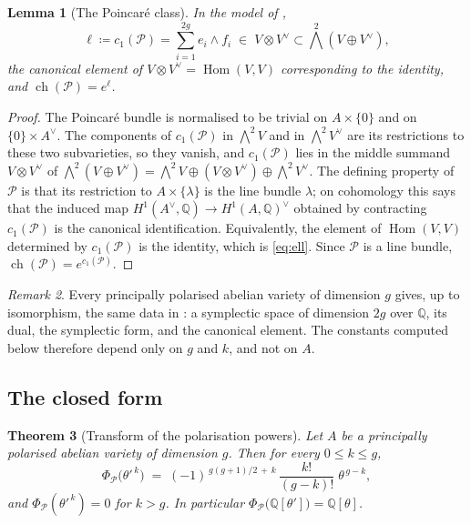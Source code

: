 \documentclass[11pt,reqno]{amsart}
\theoremstyle{plain}
\newtheorem{theorem}{Theorem}[section]
\newtheorem{lemma}[theorem]{Lemma}
\theoremstyle{definition}
\theoremstyle{remark}
\newtheorem{remark}[theorem]{Remark}
\newcommand{\QQ}{\mathbb{Q}}
\newcommand{\Av}{A^{\vee}}
\newcommand{\cP}{\mathcal{P}}
\DeclareMathOperator{\ch}{ch}
\DeclareMathOperator{\Hom}{Hom}
\begin{document}
\begin{lemma}[The Poincar\'e class]\label{lem:poincare}
In the model of ,
\begin{equation}\label{eq:ell}
  \ell\coloneqq c_{1}(\cP)=\sum_{i=1}^{2g}e_{i}\wedge f_{i}
  \;\in\;V\otimes V^{\vee}\subset\textstyle\bigwedge^{2}(V\oplus V^{\vee}),
\end{equation}
the canonical element of $V\otimes V^{\vee}=\Hom(V,V)$ corresponding to the
identity, and $\ch(\cP)=e^{\ell}$.
\end{lemma}

\begin{proof}
The Poincar\'e bundle is normalised to be trivial on $A\times\{0\}$ and on
$\{0\}\times\Av$. The components of $c_{1}(\cP)$ in $\bigwedge^{2}V$ and in
$\bigwedge^{2}V^{\vee}$ are its restrictions to these two subvarieties, so
they vanish, and $c_{1}(\cP)$ lies in the middle summand $V\otimes V^{\vee}$
of
$\bigwedge^{2}(V\oplus V^{\vee})=\bigwedge^{2}V\oplus(V\otimes V^{\vee})\oplus\bigwedge^{2}V^{\vee}$.
The defining property of $\cP$ is that its restriction to $A\times\{\lambda\}$
is the line bundle $\lambda$; on cohomology this says that the induced map
$H^{1}(\Av,\QQ)\to H^{1}(A,\QQ)^{\vee}$ obtained by contracting $c_{1}(\cP)$ is
the canonical identification. Equivalently, the element of $\Hom(V,V)$
determined by $c_{1}(\cP)$ is the identity, which is \eqref{eq:ell}. Since
$\cP$ is a line bundle, $\ch(\cP)=e^{c_{1}(\cP)}$.
\end{proof}

\begin{remark}\label{rem:universal}
Every principally polarised abelian variety of dimension $g$ gives, up to
isomorphism, the same data in : a symplectic space of
dimension $2g$ over $\QQ$, its dual, the symplectic form, and the canonical
element. The constants computed
below therefore depend only on $g$ and $k$, and not on $A$.
\end{remark}

\subsection{The closed form}

\begin{theorem}[Transform of the polarisation powers]\label{thm:fmtheta}
Let $A$ be a principally polarised abelian variety of dimension $g$. Then for
every $0\le k\le g$,
\begin{equation}\label{eq:fmtheta}
  \Phi_{\cP}\bigl(\theta'^{\,k}\bigr)
  \;=\;(-1)^{\,g(g+1)/2\,+\,k}\,\frac{k!}{(g-k)!}\;\theta^{\,g-k},
\end{equation}
and $\Phi_{\cP}(\theta'^{\,k})=0$ for $k>g$. In particular
$\Phi_{\cP}\bigl(\QQ[\theta']\bigr)=\QQ[\theta]$.
\end{theorem}
\end{document}
